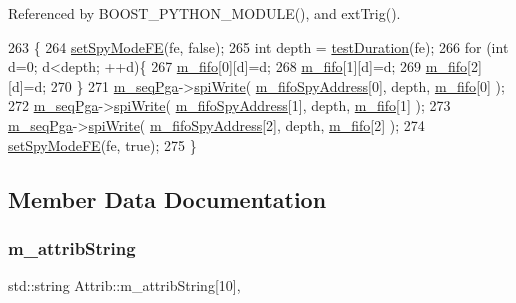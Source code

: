 Referenced by B\+O\+O\+S\+T\+\_\+\+P\+Y\+T\+H\+O\+N\+\_\+\+M\+O\+D\+U\+L\+E(), and ext\+Trig().


\begin{DoxyCode}
263                                   \{
264   \hyperlink{classFEB__v1_ab88d23abb96f746298e0fa1e1cf63e3e}{setSpyModeFE}(fe, \textcolor{keyword}{false});
265   \textcolor{keywordtype}{int} depth = \hyperlink{classFEB__v1_a7f1db8ca9490172fce7603da9e703dec}{testDuration}(fe);
266   \textcolor{keywordflow}{for} (\textcolor{keywordtype}{int} d=0; d<depth; ++d)\{
267     \hyperlink{classFEB__v1_ae5b770f2f5ffb97324862c93e3153985}{m\_fifo}[0][d]=d;
268     \hyperlink{classFEB__v1_ae5b770f2f5ffb97324862c93e3153985}{m\_fifo}[1][d]=d;
269     \hyperlink{classFEB__v1_ae5b770f2f5ffb97324862c93e3153985}{m\_fifo}[2][d]=d; 
270   \}
271   \hyperlink{classFEB__v1_a6c7804ac86796f233a8393043adf2e77}{m\_seqPga}->\hyperlink{classSeqPGA_ad4421841ce4ce8b88ad13f63216f0743}{spiWrite}( \hyperlink{classFEB__v1_a15b48648ba4534e732376b68bddc5d34}{m\_fifoSpyAddress}[0], depth, 
      \hyperlink{classFEB__v1_ae5b770f2f5ffb97324862c93e3153985}{m\_fifo}[0] );
272   \hyperlink{classFEB__v1_a6c7804ac86796f233a8393043adf2e77}{m\_seqPga}->\hyperlink{classSeqPGA_ad4421841ce4ce8b88ad13f63216f0743}{spiWrite}( \hyperlink{classFEB__v1_a15b48648ba4534e732376b68bddc5d34}{m\_fifoSpyAddress}[1], depth, 
      \hyperlink{classFEB__v1_ae5b770f2f5ffb97324862c93e3153985}{m\_fifo}[1] );
273   \hyperlink{classFEB__v1_a6c7804ac86796f233a8393043adf2e77}{m\_seqPga}->\hyperlink{classSeqPGA_ad4421841ce4ce8b88ad13f63216f0743}{spiWrite}( \hyperlink{classFEB__v1_a15b48648ba4534e732376b68bddc5d34}{m\_fifoSpyAddress}[2], depth, 
      \hyperlink{classFEB__v1_ae5b770f2f5ffb97324862c93e3153985}{m\_fifo}[2] );
274   \hyperlink{classFEB__v1_ab88d23abb96f746298e0fa1e1cf63e3e}{setSpyModeFE}(fe, \textcolor{keyword}{true});
275 \}
\end{DoxyCode}


\subsection{Member Data Documentation}
\mbox{\label{classAttrib_a3414521d7a82476e874b25a5407b5e63}} 
\subsubsection{\texorpdfstring{m\+\_\+attrib\+String}{m\_attribString}}
{\footnotesize\ttfamily std\+::string Attrib\+::m\+\_\+attrib\+String\mbox{[}10\mbox{]}\hspace{0.3cm}{\ttfamily [protected]}, {\ttfamily [inherited]}}



